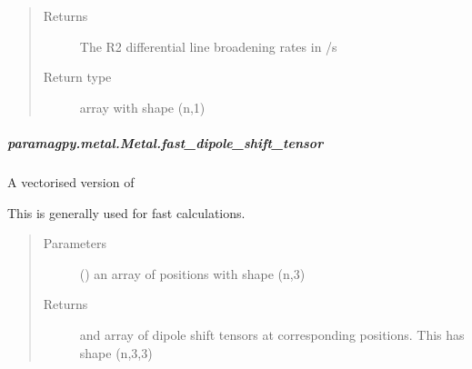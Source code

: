 \documentclass[a4paper,10pt,english,openany,oneside]{sphinxmanual}
\begin{document}
\begin{fulllineitems}
\begin{fulllineitems}
\begin{fulllineitems}
\begin{quote}
\begin{description}
\begin{itemize}
\end{itemize}

\item[{Returns}] \leavevmode
\sphinxAtStartPar
{} \textendash{} The R2 differential line broadening rates in /s

\item[{Return type}] \leavevmode
\sphinxAtStartPar
array with shape (n,1)

\end{description}\end{quote}

\end{fulllineitems}



\subparagraph{paramagpy.metal.Metal.fast\_dipole\_shift\_tensor}
\label{\detokenize{reference/generated/paramagpy.metal.Metal.fast_dipole_shift_tensor:paramagpy-metal-metal-fast-dipole-shift-tensor}}\label{\detokenize{reference/generated/paramagpy.metal.Metal.fast_dipole_shift_tensor::doc}}

\begin{fulllineitems}
\label{\detokenize{reference/generated/paramagpy.metal.Metal.fast_dipole_shift_tensor:paramagpy.metal.Metal.fast_dipole_shift_tensor}}
\sphinxAtStartPar
A vectorised version of
{\hyperref[\detokenize{reference/generated/paramagpy.metal.Metal.dipole_shift_tensor:paramagpy.metal.Metal.dipole_shift_tensor}]{}}

\sphinxAtStartPar
This is generally used for fast calculations.
\begin{quote}\begin{description}
\item[{Parameters}] \leavevmode
\sphinxAtStartPar
{} () \textendash{} an array of positions with shape (n,3)

\item[{Returns}] \leavevmode
\sphinxAtStartPar
{} \textendash{} and array of dipole shift tensors at corresponding positions.
This has shape (n,3,3)


\end{description}
\end{quote}
\end{fulllineitems}
\end{fulllineitems}
\end{fulllineitems}
\end{document}
